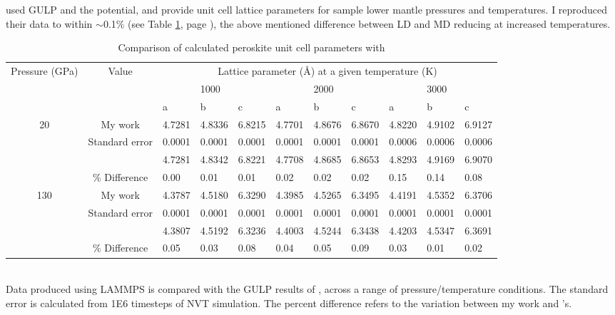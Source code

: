 \citet{Ammann2014} used GULP and the \citet{Oganov2000} potential, and provide unit cell lattice parameters for sample lower mantle pressures and temperatures. I reproduced their data to within $\sim$0.1\% (see Table \ref{tab:ammann_comp}, page \pageref{tab:ammann_comp}), the above mentioned difference between LD and MD reducing at increased temperatures.

\begin{table}
  \centering
  \caption{Comparison of calculated \mgsios peroskite unit cell parameters with \cite{Ammann2014}}\vspace{2mm}
    \begin{tabular}{cc|lll|lll|lll}
    \hline
    \multirow{3}[2]{*}{Pressure (GPa)} & \multirow{3}[2]{*}{Value} & \multicolumn{9}{c}{Lattice parameter (\AA) at a given temperature (K)} \\
          &       &       & 1000  &       &       & 2000  &       &       & 3000  &  \\
          &       & a     & b     & c     & a     & b     & c     & a     & b     & c \\ \hline
    \multirow{4}[2]{*}{20} & My work & 4.7281 & 4.8336 & 6.8215 & 4.7701 & 4.8676 & 6.8670 & 4.8220 & 4.9102 & 6.9127 \\
          & Standard error & 0.0001 & 0.0001 & 0.0001 & 0.0001 & 0.0001 & 0.0001 & 0.0006 & 0.0006 & 0.0006 \\
          & \citeauthor{Ammann2014} & 4.7281 & 4.8342 & 6.8221 & 4.7708 & 4.8685 & 6.8653 & 4.8293 & 4.9169 & 6.9070 \\
          & \% Difference & 0.00  & 0.01  & 0.01  & 0.02  & 0.02  & 0.02  & 0.15  & 0.14  & 0.08 \\ \hline
    \multirow{4}[2]{*}{130} & My work & 4.3787 & 4.5180 & 6.3290 & 4.3985 & 4.5265 & 6.3495 & 4.4191 & 4.5352 & 6.3706 \\
          & Standard error & 0.0001 & 0.0001 & 0.0001 & 0.0001 & 0.0001 & 0.0001 & 0.0001 & 0.0001 & 0.0001 \\
          & \citeauthor{Ammann2014} & 4.3807 & 4.5192 & 6.3236 & 4.4003 & 4.5244 & 6.3438 & 4.4203 & 4.5347 & 6.3691 \\
          & \% Difference & 0.05  & 0.03  & 0.08  & 0.04  & 0.05  & 0.09  & 0.03  & 0.01  & 0.02 \\
    \hline
    \end{tabular} 
\\ \vspace{2mm}
Data produced using LAMMPS is compared with the GULP results of \cite{Ammann2014}, across a range of pressure/temperature conditions. The standard error is calculated from 1E6 timesteps of NVT simulation. The percent difference refers to the variation between my work and \citeauthor{Ammann2014}'s. 
  \label{tab:ammann_comp}%
\end{table}%





